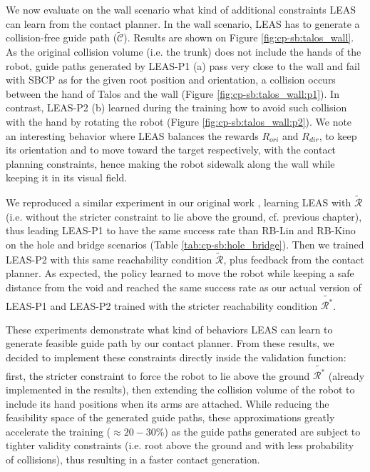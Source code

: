 We now evaluate on the wall scenario what kind of additional constraints LEAS can learn from the contact planner. In the wall scenario, LEAS has to generate a collision-free guide path ($\tilde{\mathcal{C}}$).
Results are shown on Figure \ref{fig:cp-sb:talos_wall}.
As the original collision volume (i.e. the trunk) does not include the hands of the robot, guide paths generated by LEAS-P1 (a) pass very close to the wall and fail with SBCP as for the given root position and orientation, a collision occurs between the hand of Talos and the wall (Figure \ref{fig:cp-sb:talos_wall:p1}).
In contrast, LEAS-P2 (b) learned during the training how to avoid such collision with the hand by rotating the robot (Figure \ref{fig:cp-sb:talos_wall:p2}).
We note an interesting behavior where LEAS balances the rewards $R_{ori}$ and $R_{dir}$, to keep its orientation and to move toward the target respectively, with the contact planning constraints, hence making the robot sidewalk along the wall while keeping it in its visual field.

We reproduced a similar experiment in our original work \cite{LEAS}, learning LEAS with $\tilde{\mathcal{R}}$ (i.e. without the stricter constraint to lie above the ground, cf. previous chapter), thus leading LEAS-P1 to have the same success rate than RB-Lin and RB-Kino on the hole and bridge scenarios (Table \ref{tab:cp-sb:hole_bridge}).
Then we trained LEAS-P2 with this same reachability condition $\tilde{\mathcal{R}}$, plus feedback from the contact planner.
As expected, the policy learned to move the robot while keeping a safe distance from the void and reached the same success rate as our actual version of LEAS-P1 and LEAS-P2 trained with the stricter reachability condition $\tilde{\mathcal{R}^*}$.

These experiments demonstrate what kind of behaviors LEAS can learn to generate feasible guide path by our contact planner. 
From these results, we decided to implement these constraints directly inside the validation function: first, the stricter constraint to force the robot to lie above the ground $\tilde{\mathcal{R}^*}$ (already implemented in the results), then extending the collision volume of the robot to include its hand positions when its arms are attached.
While reducing the feasibility space of the generated guide paths, these approximations greatly accelerate the training ($\approx 20-30$\%) as the guide paths generated are subject to tighter validity constraints (i.e. root above the ground and with less probability of collisions), thus resulting in a faster contact generation.



